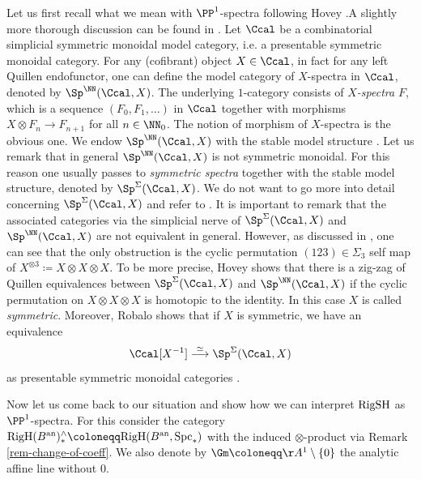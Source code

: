 \documentclass[colorinlistoftodos,article,11pt,reqno]{article}
\newcommand{\RigSH}{\textup{RigSH}}
\newcommand{\RigH}{\textup{RigH}}
\newcommand{\Spc}{\textup{Spc}}
\newcommand{\an}{\textup{an}}
\newcommand{\Arig}{\AA^{1}}
\newcommand{\To}[1][]{\overset{#1}{\longrightarrow}}
\begin{document}
Let us first recall what we mean with $\PP^1$-spectra following Hovey \cite{Hovey}.\linebreak A slightly more thorough discussion can be found in \cite[\S 2.3]{RobaloDiss}. Let $\Ccal$ be a combinatorial simplicial symmetric monoidal model category, i.e. a presentable symmetric monoidal category. For any (cofibrant) object $X\in\Ccal$, in fact for any left Quillen endofunctor, one can define the model category of $X$-spectra in $\Ccal$, denoted by $\Sp^{\NN}(\Ccal, X)$. The underlying $1$-category consists of \textit{$X$-spectra} $F$, which is a sequence $(F_0,F_1,\dots)$ in $\Ccal$ together with morphisms $X\otimes F_n\rightarrow F_{n+1}$ for all $n\in \NN_0$. The notion of morphism of $X$-spectra is the obvious one. We endow $\Sp^{\NN}(\Ccal,X)$ with the stable model structure \cite[\S 3]{Hovey}. Let us remark that in general $\Sp^{\NN}(\Ccal,X)$ is not symmetric monoidal. For this reason one usually passes to \textit{symmetric spectra} together with the stable model structure, denoted by $\Sp^\Sigma(\Ccal,X)$. We do not want to go more into detail concerning $\Sp^\Sigma(\Ccal,X)$ and refer to \cite[\S 7]{Hovey}. It is important to remark that the associated categories via the simplicial nerve of $\Sp^\Sigma(\Ccal,X)$ and $\Sp^\NN(\Ccal,X)$ are not equivalent in general. However, as discussed in \cite[\S 10]{Hovey}, one can see that the only obstruction is the cyclic permutation $(123)\in \Sigma_3$ self map of $X^{\otimes 3}\coloneqq X\otimes X\otimes X$. To be more precise, Hovey shows that there is a zig-zag of Quillen equivalences between $\Sp^\Sigma(\Ccal,X)$ and $\Sp^\NN(\Ccal,X)$ if the cyclic permutation on $X\otimes X\otimes X$ is homotopic to the identity. In this case $X$ is called \textit{symmetric}. Moreover, Robalo shows that if $X$ is symmetric, we have an equivalence 
$$
    \Ccal[X^{-1}]\To[\simeq] \Sp^\Sigma(\Ccal,X)
$$
as presentable symmetric monoidal categories \cite[Thm. 2.26]{Robalo-Thesis}.

Now let us come back to our situation and show how we can interpret $\RigSH$ as $\PP^1$-spectra. For this consider the category $\RigH(B^\an)^{\wedge}_*\coloneqq \RigH(B^\an,\Spc_*)$ with the induced $\otimes$-product via Remark \ref{rem-change-of-coeff}. We also denote by $\Gm\coloneqq \Arig\setminus\lbrace 0\rbrace$ the analytic affine line without $0$.
\end{document}
